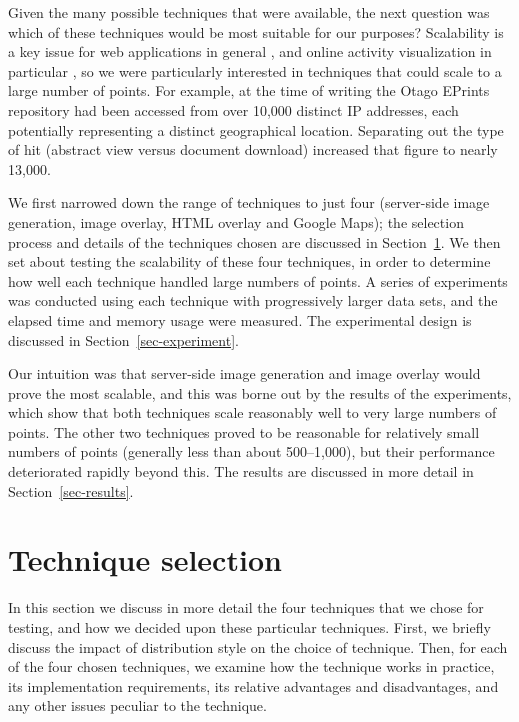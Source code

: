 \documentclass[acmtocl,acmnow]{acmtrans2m}
\begin{document}
Given the many possible techniques that were available, the next question
was which of these techniques would be most suitable for our purposes?
Scalability is a key issue for web applications in general \cite[p.\
28]{Offu-J-2002-quality}, and online activity visualization in
particular \cite[p.\ 50]{Eick-SG-2001-sitevis}, so we were particularly
interested in techniques that could scale to a large number of points. For
example, at the time of writing the Otago EPrints repository had been
accessed from over 10,000 distinct IP addresses, each potentially
representing a distinct geographical location. Separating out the type
of hit (abstract view versus document download) increased that figure to
nearly 13,000.

We first narrowed down the range of techniques to just four (server-side
image generation, image overlay, HTML overlay and Google Maps); the
selection process and details of the techniques chosen are discussed in
Section~\ref{sec-techniques}. We then set about testing the scalability
of these four techniques, in order to determine how well each technique
handled large numbers of points. A series of experiments was conducted
using each technique with progressively larger data sets, and the
elapsed time and memory usage were measured. The experimental design is
discussed in Section~\ref{sec-experiment}.

Our intuition was that server-side image generation and image overlay
would prove the most scalable, and this was borne out by the results of
the experiments, which show that both techniques scale reasonably well
to very large numbers of points. The other two techniques proved to be
reasonable for relatively small numbers of points (generally less than
about 500--1,000), but their performance deteriorated rapidly beyond
this. The results are discussed in more detail in
Section~\ref{sec-results}.


\section{Technique selection}
\label{sec-techniques}

In this section we discuss in more detail the four techniques that we
chose for testing, and how we decided upon these particular techniques.
First, we briefly discuss the impact of distribution style on the choice
of technique. Then, for each of the four chosen techniques, we examine
how the technique works in practice, its implementation requirements,
its relative advantages and disadvantages, and any other issues peculiar
to the technique.
\end{document}
